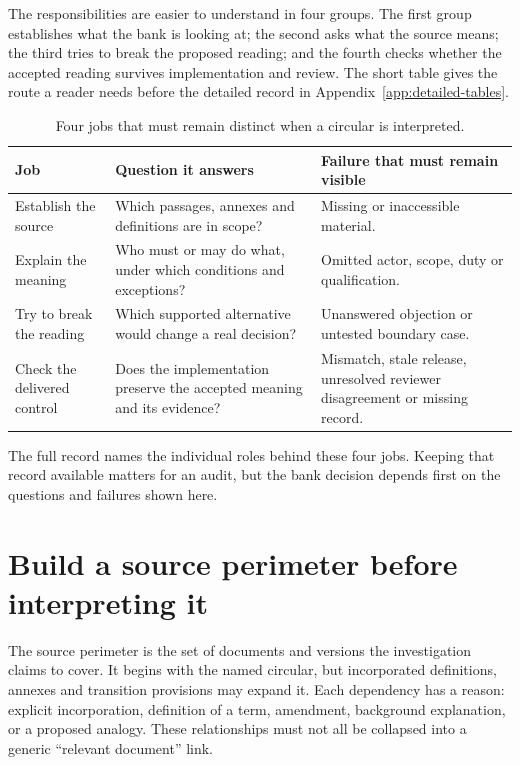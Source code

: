 The responsibilities are easier to understand in four groups. The first group
establishes what the bank is looking at; the second asks what the source means;
the third tries to break the proposed reading; and the fourth checks whether the
accepted reading survives implementation and review. The short table gives the
route a reader needs before the detailed record in Appendix~\ref{app:detailed-tables}.

\begin{table}[htbp]
\centering
\caption{Four jobs that must remain distinct when a circular is interpreted.}
\label{tab:ensemble-roles}
\begin{tabularx}{\textwidth}{P{35mm}YY}
\toprule
Job & Question it answers & Failure that must remain visible\\
\midrule
Establish the source & Which passages, annexes and definitions are in scope? & Missing or inaccessible material.\\
Explain the meaning & Who must or may do what, under which conditions and exceptions? & Omitted actor, scope, duty or qualification.\\
Try to break the reading & Which supported alternative would change a real decision? & Unanswered objection or untested boundary case.\\
Check the delivered control & Does the implementation preserve the accepted meaning and its evidence? & Mismatch, stale release, unresolved reviewer disagreement or missing record.\\
\bottomrule
\end{tabularx}
\end{table}

The full record names the individual roles behind these four jobs. Keeping that
record available matters for an audit, but the bank decision depends first on the
questions and failures shown here.

\section{Build a source perimeter before interpreting it}
\label{merge:M06:03}


The source perimeter is the set of documents and versions the investigation
claims to cover. It begins with the named circular, but incorporated definitions,
annexes and transition provisions may expand it. Each dependency has a reason:
explicit incorporation, definition of a term, amendment, background explanation,
or a proposed analogy. These relationships must not all be collapsed into a
generic ``relevant document'' link.

